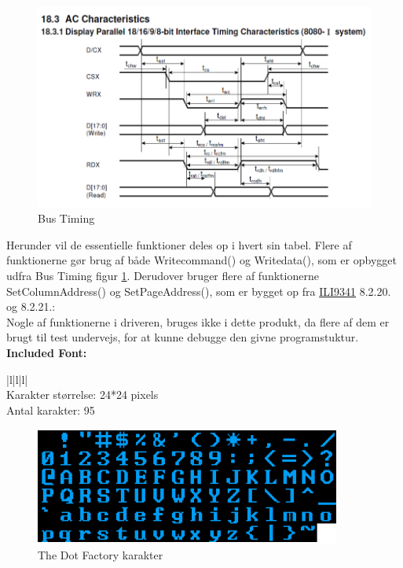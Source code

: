 \begin{figure}[H]
	\centering
	\includegraphics[width = 400 pt]{Img/Bus_timing.png}
	\caption{Bus Timing}
	\label{fig:Bus_timing}
\end{figure}

Herunder vil de essentielle funktioner deles op i hvert sin tabel. Flere af funktionerne gør brug af både Writecommand() og Writedata(), som er opbygget udfra Bus Timing figur \ref{fig:Bus_timing}. Derudover bruger flere af funktionerne SetColumnAddress() og SetPageAddress(), som er bygget op fra \href{https://blackboard.au.dk/bbcswebdav/pid-1697983-dt-content-rid-3847230_1/courses/BB-Cou-UUVA-73302/BB-Cou-UUVA-65758_ImportedContent_20170106021228/BB-Cou-STADS-UUVA-52360_ImportedContent_20160107025559/LAB/Lab3a%20Graphic%20LCD%20Display/Files%20for%20LAB3a/ILI9341_v1.11.pdf}{ILI9341} 
8.2.20. og 8.2.21.: \\
Nogle af funktionerne i driveren, bruges ikke i dette produkt, da flere af dem er brugt til test undervejs, for at kunne debugge den givne programstuktur.
\newline
\newline
\textbf{\large Included Font:}

\begin{center}
\begin{tabular}{ |l|l|l| }
\hline
{} \\
\hline
Karakter størrelse: 24*24 pixels  \\
Antal karakter: 95\\
\hline

\end{tabular}
\end{center} 
\begin{figure}[H]
	\centering
	\includegraphics[width = 150 pt]{Img/Thedotfactory.png}
	\caption{The Dot Factory karakter}
	\label{fig:Thedotfactory}
\end{figure}

